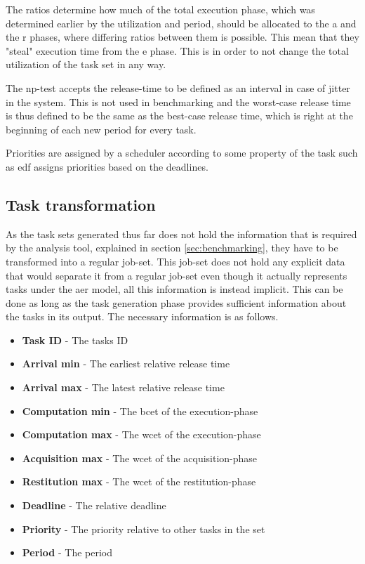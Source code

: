 \documentclass{kththesis}
\begin{document}
The ratios determine how much of the total execution phase, which was determined earlier by the
utilization and period, should be allocated to the \acrshort{a} and the \acrshort{r} phases, where
differing ratios between them is possible. This mean that they "steal" execution time from the
\acrshort{e} phase. This is in order to not change the total utilization of the task set in any way.

The \acrshort{np}-test accepts the release-time to be defined as an interval in case of jitter in
the system. This is not used in benchmarking and the worst-case release time is thus defined to be
the same as the best-case release time, which is right at the beginning of each new period for every
task.

Priorities are assigned by a scheduler according to some property of the task such as \acrshort{edf}
assigns priorities based on the deadlines.


\subsection{Task transformation} \label{sub:task_transformation}

As the task sets generated thus far does not hold the information that is required by the analysis
tool, explained in section \ref{sec:benchmarking}, they have to be transformed into a regular job-set. This
job-set does not hold any explicit data that would separate it from a regular job-set even though it
actually represents tasks under the \acrshort{aer} model, all this information is instead implicit.
This can be done as long as the task generation phase provides sufficient information about the
tasks in its output. The necessary information is as follows.

\begin{itemize}
    \item \textbf{Task ID} - The tasks ID
    \item \textbf{Arrival min} - The earliest relative release time
    \item \textbf{Arrival max} - The latest relative release time
    \item \textbf{Computation min} - The \acrshort{bcet} of the execution-phase
    \item \textbf{Computation max} - The \acrshort{wcet} of the execution-phase
    \item \textbf{Acquisition max} - The \acrshort{wcet} of the acquisition-phase
    \item \textbf{Restitution max} - The \acrshort{wcet} of the restitution-phase
    \item \textbf{Deadline} - The relative deadline
    \item \textbf{Priority} - The priority relative to other tasks in the set
    \item \textbf{Period} - The period 
\end{itemize}
\end{document}
